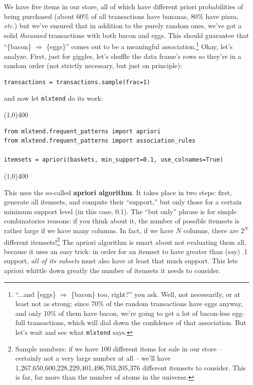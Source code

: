 \documentclass[12pt]{article}
\begin{document}
We have five items in our store, all of which have different priori
probabilities of being purchased (about 60\% of all transactions have bananas,
80\% have pizza, \textit{etc.}) but we've ensured that in addition to the
purely random ones, we've got a solid \textit{thousand} transactions with both
bacon and eggs. This should guarantee that ``\{bacon\} $\Rightarrow$
\{eggs\}''
comes out to be a meaningful association.\footnote{``...and \{eggs\}
$\Rightarrow$ \{bacon\} too, right?'' you ask. Well, not necessarily, or at
least not as strong: since 70\% of the random transactions have eggs anyway,
and only 10\% of them have bacon, we're going to get a lot of bacon-less
egg-full transactions, which will dial down the confidence of that
association. But let's wait and see what \texttt{mlxtend} says.}
\pagebreak
Okay, let's analyze. First, just for giggles, let's shuffle the data frame's
rows so they're in a random order (not strictly necessary, but just on
principle):

\begin{Verbatim}[fontsize=\small,samepage=true,frame=none]
transactions = transactions.sample(frac=1)
\end{Verbatim}

and now let \texttt{mlxtend} do its work:
\begin{center}
\line(1,0){400}
\end{center}
\begin{Verbatim}[fontsize=\small,samepage=true,frame=none]
from mlxtend.frequent_patterns import apriori
from mlxtend.frequent_patterns import association_rules

itemsets = apriori(baskets, min_support=0.1, use_colnames=True)
\end{Verbatim}
\vspace{-.3in}
\begin{center}
\line(1,0){400}
\end{center}

This uses the so-called \textbf{apriori algorithm}. It takes place in two
steps: first, generate all itemsets, and compute their ``support,'' but only
those for a certain minimum support level (in this case, 0.1). The ``but
only''
phrase is for simple combinatorics reasons: if you think about it, the number
of possible itemsets is rather large if we have many columns. In fact, if we
have $N$ columns, there are $2^N$ different itemsets!\footnote{Sample numbers:
if we have 100 different items for sale in our store -- certainly not a very
large number at all -- we'll have 1,267,650,600,228,229,401,496,703,205,376
different itemsets to consider. This is far, far more than the number of atoms
in the universe.} The apriori algorithm is smart about not evaluating them
all, because it uses an easy trick: in order for an itemset to have greater
than (say) .1 support, \textit{all of its subsets} must also have at least
that much support. This lets apriori whittle down greatly the number of
itemsets it needs to consider.
\end{document}
